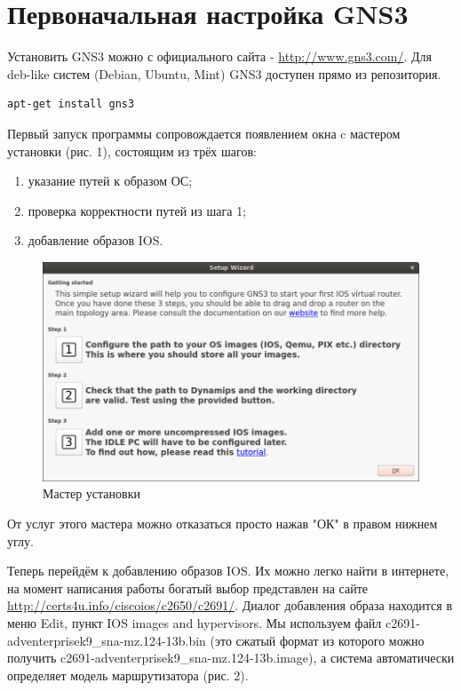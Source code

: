 \newpage
\section{Первоначальная настройка GNS3}

Установить GNS3 можно с официального сайта - \url{http://www.gns3.com/}. Для deb-like систем (Debian, Ubuntu, Mint) GNS3 доступен прямо из репозитория.

\begin{Verbatim}[frame=single]
apt-get install gns3
\end{Verbatim}

Первый запуск программы сопровождается появлением окна c мастером установки (рис. 1), состоящим из трёх шагов:
\begin{enumerate}
  \item указание путей к образом ОС;
  \item проверка корректности путей из шага 1;
  \item добавление образов IOS.
\end{enumerate}

\begin{figure}[h!]
\centering
\includegraphics[scale=0.55]{res/pic001}
\caption{Мастер установки}
\end{figure}

От услуг этого мастера можно отказаться просто нажав "ОК" в правом нижнем углу.

Теперь перейдём к добавлению образов IOS. Их можно легко найти в интернете, на момент написания работы богатый выбор представлен на сайте \url{http://certs4u.info/ciscoios/c2650/c2691/}. Диалог добавления образа находится в меню Edit, пункт IOS images and hypervisors. Мы используем файл c2691-adventerprisek9\_sna-mz.124-13b.bin (это сжатый формат из которого можно получить c2691-adventerprisek9\_sna-mz.124-13b.image), а система автоматически определяет модель маршрутизатора (рис. 2).

